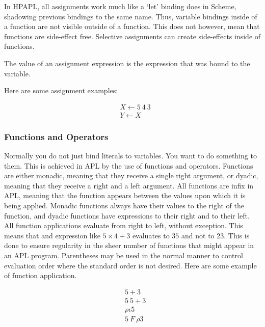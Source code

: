 In HPAPL, all assignments work much like a `let' binding does in Scheme, 
shadowing previous bindings to the same name. Thus, variable bindings inside 
of a function are not visible outside of a function. This does not however, 
mean that functions are side-effect free. Selective assignments can 
create side-effects inside of functions.

The value of an assignment expression is the expression that was bound to 
the variable.

Here are some assignment examples:

\begin{align}
&X\gets 5\ 4\ 3\\
&Y\gets X
\end{align}

\subsubsection{Functions and Operators}

Normally you do not just bind literals to variables. You want to do something 
to them. This is achieved in APL by the use of functions and operators.
Functions are either monadic, meaning that they receive a single right 
argument, or dyadic, meaning that they receive a right and a left argument. 
All functions are infix in APL, meaning that the function appears 
between the values upon which it is being applied. Monadic functions always 
have their values to the right of the function, and dyadic functions have 
expressions to their right and to their left. All function applications 
evaluate from right to left, without exception. This means that 
and expression like $5\times 4 + 3$ evaluates to $35$ and not to $23$.
This is done to ensure regularity in the sheer number of functions that 
might appear in an APL program. Parentheses may be used in the normal 
manner to control evaluation order where the standard order is not desired.
Here are some example of function application.

\begin{align}
&5 + 3\\
&5\ 5 + 3\\
&\rho\iota 5 \\
&5\ F\ \rho 3
\end{align}

